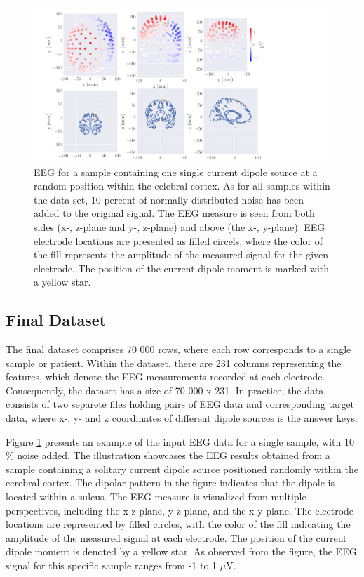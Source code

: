 \documentclass[a4paper, UKenglish, 11pt]{uiomaster}
\begin{document}
\begin{figure}[!htb]
    \centering
    \includegraphics[width=\linewidth]{figures/simple_example.pdf}
    \caption{EEG for a sample containing one single current dipole source at a random position within the celebral cortex. As for all samples within the data set, 10 percent of normally distributed noise has been added to the original signal. The EEG measure is seen from both sides (x-, z-plane and y-, z-plane) and above (the x-, y-plane). EEG electrode locations are presented as filled circels, where the color of the fill represents the amplitude of the measured signal for the given electrode. The position of the current dipole moment is marked with a yellow star.}
    \label{fig:eeg_field_1_dipole_example}
\end{figure}

\subsection{Final Dataset}
The final dataset comprises 70 000 rows, where each row corresponds to a single sample or patient. Within the dataset, there are 231 columns representing the features, which denote the EEG measurements recorded at each electrode. Consequently, the dataset has a size of 70 000 x 231. In practice, the data consists of two separete files holding pairs of EEG data and corresponding target data, where x-, y- and z coordinates of different dipole sources is the answer keys.

Figure \ref{fig:eeg_field_1_dipole_example} presents an example of the input EEG data for a single sample, with 10$\%$ noise added. The illustration showcases the EEG results obtained from a sample containing a solitary current dipole source positioned randomly within the cerebral cortex. The dipolar pattern in the figure indicates that the dipole is located within a sulcus. The EEG measure is visualized from multiple perspectives, including the x-z plane, y-z plane, and the x-y plane. The electrode locations are represented by filled circles, with the color of the fill indicating the amplitude of the measured signal at each electrode. The position of the current dipole moment is denoted by a yellow star. As observed from the figure, the EEG signal for this specific sample ranges from -1 to 1 $\mu$V.
\end{document}
